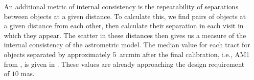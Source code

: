 An additional \gls{metric} of internal consistency is the repeatability of separations between objects at a given distance.
To calculate this, we find pairs of objects at a given distance from each other, then calculate their separation in each visit in which they appear.
The scatter in these distances then gives us a measure of the internal consistency of the astrometric model.
The median value for each tract for objects separated by approximately 5~arcmin after the final calibration, i.e., AM1 from \citet{LPM-17}, is given in .
These values are already approaching the design requirement of $10$ mas.

